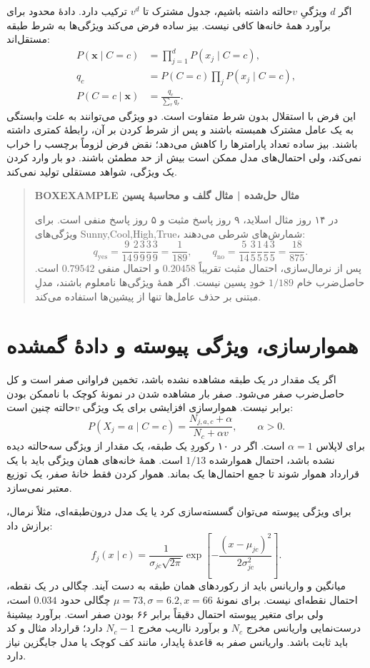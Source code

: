 اگر $d$ ویژگیِ $v$حالته داشته باشیم، جدول مشترک تا $v^d$ ترکیب دارد. دادهٔ محدود برای برآورد همهٔ خانه‌ها کافی نیست. بیز ساده فرض می‌کند ویژگی‌ها به شرط طبقه مستقل‌اند:
\begin{align*}
P(\mathbf x\mid C=c)&=\prod_{j=1}^dP(x_j\mid C=c),\\
q_c&=P(C=c)\prod_jP(x_j\mid C=c),\\
P(C=c\mid\mathbf x)&=\frac{q_c}{\sum_rq_r}.
\end{align*}
این فرض با استقلال بدون شرط متفاوت است. دو ویژگی می‌توانند به علت وابستگی به یک عامل مشترک همبسته باشند و پس از شرط کردن بر آن، رابطهٔ کمتری داشته باشند. بیز ساده تعداد پارامترها را کاهش می‌دهد؛ نقض فرض لزوماً برچسب را خراب نمی‌کند، ولی احتمال‌های مدل ممکن است بیش از حد مطمئن باشند. دو بار وارد کردن یک ویژگی، شواهد مستقلی تولید نمی‌کند.

\begin{quote}\textbf{BOXEXAMPLE مثال حل‌شده | مثال گلف و محاسبهٔ پسین}\par 
در ۱۴ روز مثال اسلاید، ۹ روز پاسخ مثبت و ۵ روز پاسخ منفی است. برای ویژگی‌های Sunny,Cool,High,True، شمارش‌های شرطی می‌دهند:
\[q_{\mathrm{yes}}=\frac9{14}\frac29\frac39\frac39\frac39=\frac1{189},\qquad q_{\mathrm{no}}=\frac5{14}\frac35\frac15\frac45\frac35=\frac{18}{875}.\]
پس از نرمال‌سازی، احتمال مثبت تقریباً $0.20458$ و احتمال منفی $0.79542$ است. حاصل‌ضرب خام $1/189$ خودِ پسین نیست. اگر همهٔ ویژگی‌ها نامعلوم باشند، مدلِ مبتنی بر حذف عامل‌ها تنها از پیشین‌ها استفاده می‌کند.
\end{quote}

\section{هموارسازی، ویژگی پیوسته و دادهٔ گمشده}
اگر یک مقدار در یک طبقه مشاهده نشده باشد، تخمین فراوانی صفر است و کل حاصل‌ضرب صفر می‌شود. صفر بار مشاهده شدن در نمونهٔ کوچک با ناممکن بودن برابر نیست. هموارسازی افزایشی برای یک ویژگی $v$حالته چنین است:
\[P(X_j=a\mid C=c)=\frac{N_{j,a,c}+\alpha}{N_c+\alpha v},\qquad\alpha>0.\]
برای لاپلاس $\alpha=1$ است. اگر در ۱۰ رکوردِ یک طبقه، یک مقدار از ویژگی سه‌حالته دیده نشده باشد، احتمال هموارشده $1/13$ است. همهٔ خانه‌های همان ویژگی باید با یک قرارداد هموار شوند تا جمع احتمال‌ها یک بماند. هموار کردن فقط خانهٔ صفر، یک توزیع معتبر نمی‌سازد.

برای ویژگی پیوسته می‌توان گسسته‌سازی کرد یا یک مدل درون‌طبقه‌ای، مثلاً نرمال، برازش داد:
\[f_j(x\mid c)=\frac1{\sigma_{jc}\sqrt{2\pi}}\exp\left[-\frac{(x-\mu_{jc})^2}{2\sigma_{jc}^2}\right].\]
میانگین و واریانس باید از رکوردهای همان طبقه به دست آیند. چگالی در یک نقطه، احتمال نقطه‌ای نیست. برای نمونهٔ $\mu=73,\sigma=6.2,x=66$ چگالی حدود $0.034$ است، ولی برای متغیر پیوسته احتمال دقیقاً برابر ۶۶ بودن صفر است. برآورد بیشینهٔ درست‌نمایی واریانس مخرج $N_c$ و برآورد نااریب مخرج $N_c-1$ دارد؛ قرارداد مثال و کد باید ثابت باشد. واریانس صفر به قاعدهٔ پایدار، مانند کف کوچک یا مدل جایگزین نیاز دارد.

